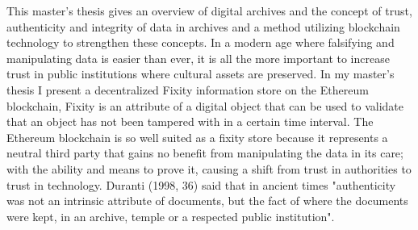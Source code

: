 This master's thesis gives an overview of digital archives and the concept of trust, authenticity and integrity of data in archives and a method utilizing blockchain technology to strengthen these concepts. In a modern age where falsifying and manipulating data is easier than ever, it is all the more important to increase trust in public institutions where cultural assets are preserved.
In my master's thesis I present a decentralized Fixity information store on the Ethereum blockchain, Fixity is an attribute of a digital object that can be used to validate that an object has not been tampered with in a certain time interval. The Ethereum blockchain is so well suited as a fixity store because it represents a neutral third party that gains no benefit from manipulating the data in its care; with the ability and means to prove it, causing a shift from trust in authorities to trust in technology. Duranti (1998, 36) said that in ancient times "authenticity was not an intrinsic attribute of documents, but the fact of where the documents were kept, in an archive, temple or a respected public institution". 